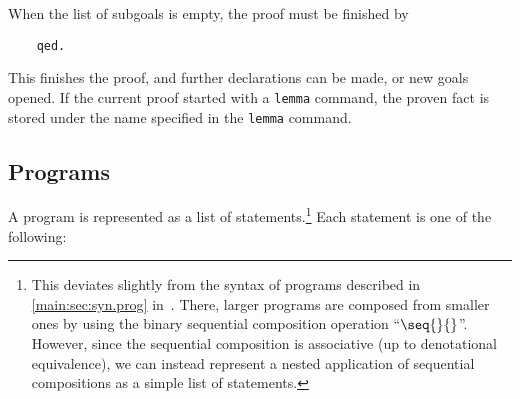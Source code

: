 \documentclass{article}
\newcommand\qrhlautoref[1]{\autoref{main:#1} in~\cite{qrhl-paper-from-manual}}
\begin{document}
When the list of subgoals is empty, the proof must be finished by
\begin{center}
  \begin{lstlisting}
    qed.
  \end{lstlisting}
\end{center}
This finishes the proof, and further declarations can be made, or new
goals opened. If the current proof started with a \texttt{lemma}
command, the proven fact is stored under the name specified in the
\texttt{lemma} command.

\newpage

\subsection{Programs}
\label{sec:tool.programs}

A program is represented as a list of statements.\footnote{This
  deviates slightly from the syntax of programs described in
  \qrhlautoref{sec:syn.prog}. There, larger programs are composed from
  smaller ones by using the binary sequential composition operation
  ``$\seq{}{}$''.
  However, since the sequential composition is associative (up to
  denotational equivalence), we can instead represent a nested
  application of sequential compositions as a simple list of
  statements.} Each statement is one of the following:

\newcommand\toolprog[1]{\index{#1@\textttOLD{#1} (tool program syntax)}}
\end{document}
